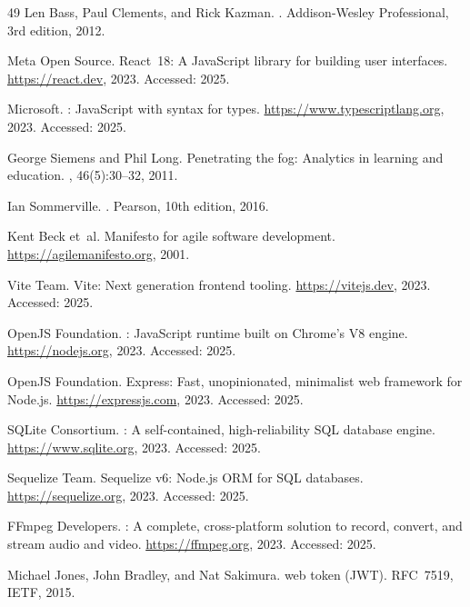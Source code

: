 \begin{thebibliography}{49}
Len Bass, Paul Clements, and Rick Kazman.
.
\newblock Addison-Wesley Professional, 3rd edition, 2012.


{Meta Open Source}.
\newblock React~18: A {JavaScript} library for building user interfaces.
\newblock \url{https://react.dev}, 2023.
\newblock Accessed: 2025.

{Microsoft}.
: {JavaScript} with syntax for types.
\newblock \url{https://www.typescriptlang.org}, 2023.
\newblock Accessed: 2025.


George Siemens and Phil Long.
\newblock Penetrating the fog: Analytics in learning and education.
, 46(5):30--32, 2011.

Ian Sommerville.
.
\newblock Pearson, 10th edition, 2016.

Kent Beck et~al.
\newblock Manifesto for agile software development.
\newblock \url{https://agilemanifesto.org}, 2001.

{Vite Team}.
\newblock Vite: Next generation frontend tooling.
\newblock \url{https://vitejs.dev}, 2023.
\newblock Accessed: 2025.

{OpenJS Foundation}.
: {JavaScript} runtime built on {Chrome's V8} engine.
\newblock \url{https://nodejs.org}, 2023.
\newblock Accessed: 2025.

{OpenJS Foundation}.
\newblock Express: Fast, unopinionated, minimalist web framework for {Node.js}.
\newblock \url{https://expressjs.com}, 2023.
\newblock Accessed: 2025.

{SQLite Consortium}.
: A self-contained, high-reliability {SQL} database engine.
\newblock \url{https://www.sqlite.org}, 2023.
\newblock Accessed: 2025.

{Sequelize Team}.
\newblock Sequelize v6: {Node.js} {ORM} for {SQL} databases.
\newblock \url{https://sequelize.org}, 2023.
\newblock Accessed: 2025.

{FFmpeg Developers}.
: A complete, cross-platform solution to record, convert, and stream audio and video.
\newblock \url{https://ffmpeg.org}, 2023.
\newblock Accessed: 2025.

Michael Jones, John Bradley, and Nat Sakimura.
 web token ({JWT}).
\newblock RFC~7519, IETF, 2015.

\end{thebibliography}
